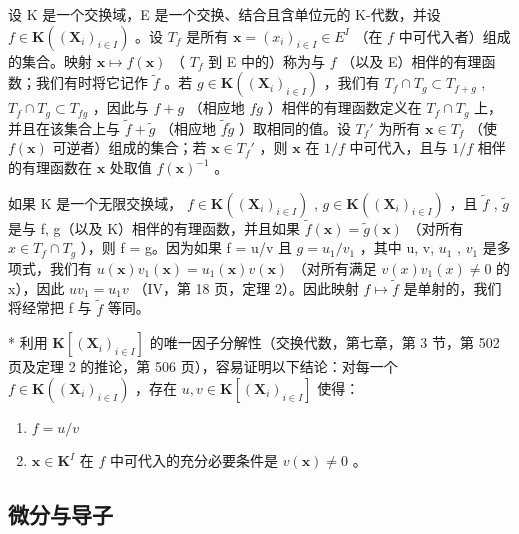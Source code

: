 设 K 是一个交换域，E 是一个交换、结合且含单位元的 K-代数，并设 \(f \in \mathbf{K}((\mathbf{X}_i)_{i \in I})\) 。设 \(T_f\) 是所有 \(\mathbf{x} = (x_i)_{i \in I} \in E^{I}\) （在 \(f\) 中可代入者）组成的集合。映射 \(\mathbf{x} \mapsto f(\mathbf{x})\) （ \(T_f\) 到 E 中的）称为与 \(f\) （以及 E）相伴的有理函数；我们有时将它记作 \(\tilde{f}\) 。若 \(g \in \mathbf{K}((\mathbf{X}_i)_{i \in I})\) ，我们有 \(T_f \cap T_g \subset T_{f + g}\) , \(T_f \cap T_g \subset T_{fg}\) ，因此与 \(f + g\) （相应地 \(fg\) ）相伴的有理函数定义在 \(T_f \cap T_g\) 上，并且在该集合上与 \(\tilde{f} + \tilde{g}\) （相应地 \(\tilde{f}\tilde{g}\) ）取相同的值。设 \(T_f'\) 为所有 \(\mathbf{x} \in T_f\) （使 \(f(\mathbf{x})\) 可逆者）组成的集合；若 \(\mathbf{x} \in T_f'\) ，则 \(\mathbf{x}\) 在 \(1/f\) 中可代入，且与 \(1/f\) 相伴的有理函数在 \(\mathbf{x}\) 处取值 \(f(\mathbf{x})^{-1}\) 。

如果 K 是一个无限交换域， \(f \in \mathbf{K}((\mathbf{X}_i)_{i \in I})\) , \(g \in \mathbf{K}((\mathbf{X}_i)_{i \in I})\) ，且 \(\tilde{f}\) , \(\tilde{g}\) 是与 f, g（以及 K）相伴的有理函数，并且如果 \(\tilde{f}(\mathbf{x}) = \tilde{g}(\mathbf{x})\) （对所有 \(x \in T_f \cap T_g\) ），则 f = g。因为如果 f = u/v 且 \(g = u_1 / v_1\) ，其中 u, v, \(u_1\) , \(v_1\) 是多项式，我们有 \(u(\mathbf{x})v_1(\mathbf{x}) = u_1(\mathbf{x})v(\mathbf{x})\) （对所有满足 \(v(x)v_1(x) \neq 0\) 的 x），因此 \(uv_1 = u_1v\) （IV，第 18 页，定理 2）。因此映射 \(f \mapsto \tilde{f}\) 是单射的，我们将经常把 f 与 \(\tilde{f}\) 等同。

* 利用 \(\mathbf{K}[(\mathbf{X}_i)_{i\in I}]\) 的唯一因子分解性（交换代数，第七章，第 3 节，第 502 页及定理 2 的推论，第 506 页），容易证明以下结论：对每一个 \(f\in \mathbf{K}((\mathbf{X}_i)_{i\in I})\) ，存在 \(u,v\in \mathbf{K}[(\mathbf{X}_i)_{i\in I}]\) 使得：

\begin{enumerate}
\def\labelenumi{\arabic{enumi})}
\item
  \(f = u / v\)
\item
  \(\mathbf{x} \in \mathbf{K}^{I}\) 在 \(f\) 中可代入的充分必要条件是 \(v(\mathbf{x}) \neq 0\) 。
\end{enumerate}

\subsection{微分与导子}

